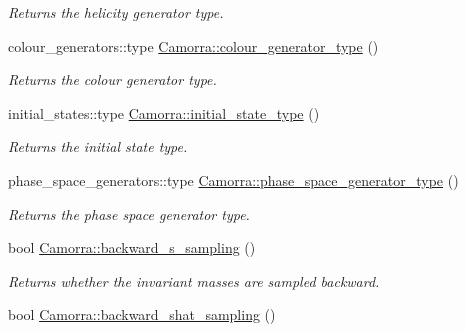 \begin{DoxyCompactItemize}
\begin{DoxyCompactList}\small\item\em Returns the helicity generator type. \end{DoxyCompactList}\item 
\hypertarget{a00798_a7b12504bda851b5f9add6655ca64e29d}{
colour\_\-generators::type \hyperlink{a00798_a7b12504bda851b5f9add6655ca64e29d}{Camorra::colour\_\-generator\_\-type} ()}
\label{a00798_a7b12504bda851b5f9add6655ca64e29d}

\begin{DoxyCompactList}\small\item\em Returns the colour generator type. \end{DoxyCompactList}\item 
\hypertarget{a00798_ad604036da940bd8df34f20218cf90ae7}{
initial\_\-states::type \hyperlink{a00798_ad604036da940bd8df34f20218cf90ae7}{Camorra::initial\_\-state\_\-type} ()}
\label{a00798_ad604036da940bd8df34f20218cf90ae7}

\begin{DoxyCompactList}\small\item\em Returns the initial state type. \end{DoxyCompactList}\item 
\hypertarget{a00798_aa183252f5e018fdfdaf227b5885fb835}{
phase\_\-space\_\-generators::type \hyperlink{a00798_aa183252f5e018fdfdaf227b5885fb835}{Camorra::phase\_\-space\_\-generator\_\-type} ()}
\label{a00798_aa183252f5e018fdfdaf227b5885fb835}

\begin{DoxyCompactList}\small\item\em Returns the phase space generator type. \end{DoxyCompactList}\item 
\hypertarget{a00798_a10d06d9eeb886cc2282993cf798acd48}{
bool \hyperlink{a00798_a10d06d9eeb886cc2282993cf798acd48}{Camorra::backward\_\-s\_\-sampling} ()}
\label{a00798_a10d06d9eeb886cc2282993cf798acd48}

\begin{DoxyCompactList}\small\item\em Returns whether the invariant masses are sampled backward. \end{DoxyCompactList}\item 
\hypertarget{a00798_afaf1ceb8d83f39ae2599190e77311ddd}{
bool \hyperlink{a00798_afaf1ceb8d83f39ae2599190e77311ddd}{Camorra::backward\_\-shat\_\-sampling} ()}
\label{a00798_afaf1ceb8d83f39ae2599190e77311ddd}


\end{DoxyCompactItemize}
